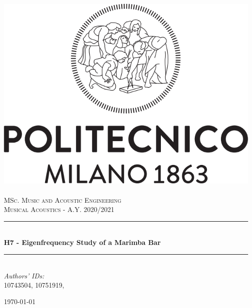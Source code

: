 \documentclass[a4paper]{article}
\title{}
\author{}
\begin{document}
\begin{titlepage}	
	\newcommand{\HRule}{\rule{\linewidth}{0.5mm}} %
	
	\center %
	
	
	\includegraphics[width=.4\textwidth]{Logo_Politecnico_Milano.png}\\[0.4cm]
	\textsc{\LARGE}\\[0.3cm] %
	
	\textsc{\large MSc. Music and Acoustic Engineering}\\[1cm] %
	
	\textsc{\Large Musical Acoustics - A.Y. 2020/2021}\\[0.5cm] %
	
	
	\HRule\\[0.4cm]
	
	{\huge\bfseries H7 - Eigenfrequency Study of a Marimba Bar }\\[0.4cm] %
	
	\HRule\\[1.5cm]
	
	
	
	{\large\textit{Authors' IDs:}}\\
	10743504, 10751919, %
	
	
	\vfill\vfill\vfill %
	
	{\large\today} %
	
	
	\vfill\vfill
	
	
	\vfill %
	
	
\end{titlepage}
\end{document}
